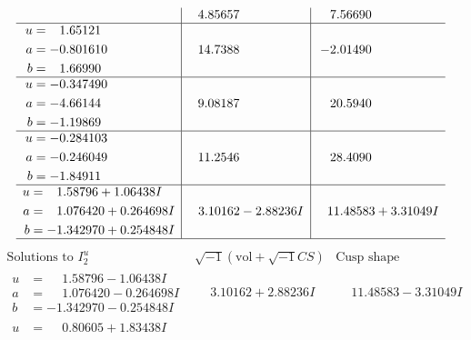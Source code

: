 \documentclass[1p]{elsarticle_modified}
\theoremstyle{definition}
\newcommand{\I}{\sqrt{-1}}
\begin{document}
$$\begin{array}{c|c|c}
 & \phantom{-}4.85657\phantom{ +0.000000I} & \phantom{-}7.56690\phantom{ +0.000000I} \\ \hline\begin{aligned}
u &= \phantom{-}1.65121\phantom{ +0.000000I} \\
a &= -0.801610\phantom{ +0.000000I} \\
b &= \phantom{-}1.66990\phantom{ +0.000000I}\end{aligned}
 & \phantom{-}14.7388\phantom{ +0.000000I} & -2.01490\phantom{ +0.000000I} \\ \hline\begin{aligned}
u &= -0.347490\phantom{ +0.000000I} \\
a &= -4.66144\phantom{ +0.000000I} \\
b &= -1.19869\phantom{ +0.000000I}\end{aligned}
 & \phantom{-}9.08187\phantom{ +0.000000I} & \phantom{-}20.5940\phantom{ +0.000000I} \\ \hline\begin{aligned}
u &= -0.284103\phantom{ +0.000000I} \\
a &= -0.246049\phantom{ +0.000000I} \\
b &= -1.84911\phantom{ +0.000000I}\end{aligned}
 & \phantom{-}11.2546\phantom{ +0.000000I} & \phantom{-}28.4090\phantom{ +0.000000I} \\ \hline\begin{aligned}
u &= \phantom{-}1.58796 + 1.06438 I \\
a &= \phantom{-}1.076420 + 0.264698 I \\
b &= -1.342970 + 0.254848 I\end{aligned}
 & \phantom{-}3.10162 - 2.88236 I & \phantom{-}11.48583 + 3.31049 I\\
 \hline 
 \end{array}$$\newpage$$\begin{array}{c|c|c}  
\text{Solutions to }I^u_{2}& \I (\text{vol} + \sqrt{-1}CS) & \text{Cusp shape}\\
 \hline 
\begin{aligned}
u &= \phantom{-}1.58796 - 1.06438 I \\
a &= \phantom{-}1.076420 - 0.264698 I \\
b &= -1.342970 - 0.254848 I\end{aligned}
 & \phantom{-}3.10162 + 2.88236 I & \phantom{-}11.48583 - 3.31049 I \\ \hline\begin{aligned}
u &= \phantom{-}0.80605 + 1.83438 I \\

\end{aligned}
\end{array}$$
\end{document}
